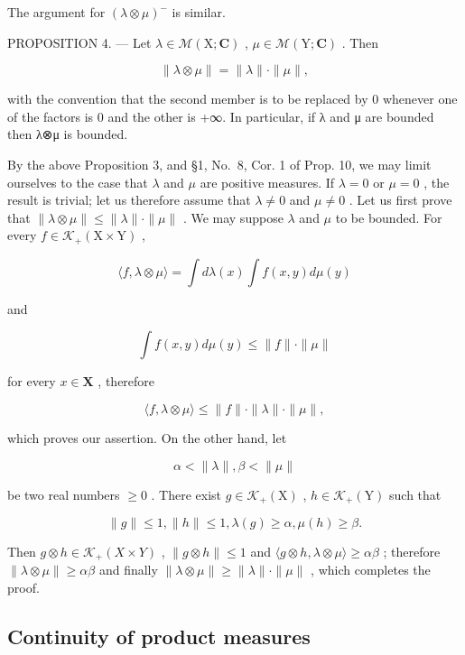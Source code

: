 The argument for \((\lambda \otimes \mu)^{-}\) is similar.

PROPOSITION 4. --- Let \(\lambda \in \mathcal{M}(\mathrm{X};\mathbf{C})\) , \(\mu \in \mathcal{M}(\mathrm{Y};\mathbf{C})\) . Then

\[
\| \lambda \otimes \mu \| = \| \lambda \| \cdot \| \mu \|,\tag{10}
\]

with the convention that the second member is to be replaced by 0 whenever one of the factors is 0 and the other is +∞. In particular, if λ and μ are bounded then λ⊗μ is bounded.

By the above Proposition 3, and §1, No.~8, Cor. 1 of Prop. 10, we may limit ourselves to the case that \(\lambda\) and \(\mu\) are positive measures. If \(\lambda = 0\) or \(\mu = 0\) , the result is trivial; let us therefore assume that \(\lambda \neq 0\) and \(\mu \neq 0\) . Let us first prove that \(\| \lambda \otimes \mu \| \leqslant \| \lambda \| \cdot \| \mu \|\) . We may suppose \(\lambda\) and \(\mu\) to be bounded. For every \(f \in \mathcal{K}_+(\mathrm{X} \times \mathrm{Y})\) ,

\[
\langle f, \lambda \otimes \mu \rangle = \int d \lambda (x) \int f (x, y) d \mu (y)
\]

and

\[
\int f (x, y) d \mu (y) \leqslant \| f \| \cdot \| \mu \|
\]

for every \(x\in \mathbf{X}\) , therefore

\[
\langle f, \lambda \otimes \mu \rangle \leqslant \| f \| \cdot \| \lambda \| \cdot \| \mu \|,
\]

which proves our assertion. On the other hand, let

\[
\alpha <   \| \lambda \|, \beta <   \| \mu \|
\]

be two real numbers \(\geqslant 0\) . There exist \(g\in \mathcal{K}_{+}(\mathrm{X})\) , \(h\in \mathcal{K}_{+}(\mathrm{Y})\) such that

\[
\| g \| \leqslant 1, \| h \| \leqslant 1, \lambda (g) \geqslant \alpha , \mu (h) \geqslant \beta .
\]

Then \(g \otimes h \in \mathcal{K}_{+}(X \times Y)\) , \(\| g \otimes h \| \leqslant 1\) and \(\langle g \otimes h, \lambda \otimes \mu \rangle \geqslant \alpha \beta\) ; therefore \(\| \lambda \otimes \mu \| \geqslant \alpha \beta\) and finally \(\| \lambda \otimes \mu \| \geqslant \| \lambda \| \cdot \| \mu \|\) , which completes the proof.

\subsection{Continuity of product measures}

